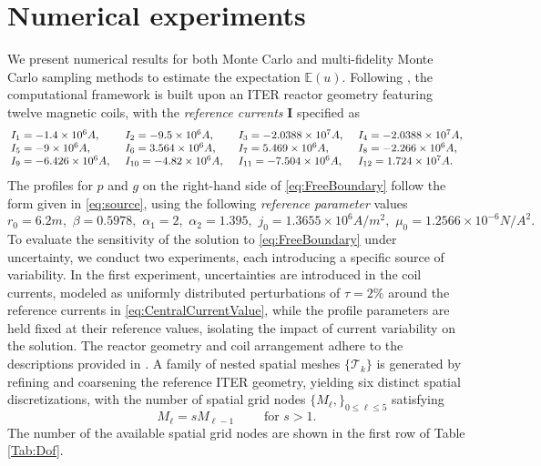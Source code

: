 \section{Numerical experiments}\label{sec:Num-Exp}
%
We present numerical results for both Monte Carlo and multi-fidelity Monte Carlo sampling methods to estimate the expectation $\mathbb{E}(u)$. Following \cite{FaHe:2017}, the computational framework is built upon an ITER reactor geometry featuring twelve magnetic coils, with the \textit{reference currents} $\boldsymbol{I}$ specified as
%
\begin{equation}\label{eq:CentralCurrentValue}
{\renewcommand{\arraycolsep}{2pt}
\begin{array}{llll}
I_1 = -1.4 \times 10^{6} A, \quad & I_2 = -9.5 \times 10^{6} A, \quad & I_3 = -2.0388 \times 10^{7} A, \quad & I_4 = -2.0388 \times 10^{7} A, \\
I_5 = -9 \times 10^{6} A, \quad & I_6 = 3.564 \times 10^{6} A, \quad & I_7 = 5.469 \times 10^{6} A, \quad & I_8 = -2.266 \times 10^{6} A, \\
I_9 = -6.426 \times 10^{6} A, \quad & I_{10} = -4.82 \times 10^{6} A, \quad & I_{11} = -7.504 \times 10^{6} A, \quad & I_{12} = 1.724 \times 10^{7} A. 
\end{array}
}
\end{equation}
%
The profiles for $p$ and $g$ on the right-hand side of \eqref{eq:FreeBoundary} follow the form given in \eqref{eq:source}, using the following \textit{reference parameter} values
%
\begin{equation}\label{eq:CentralParameterValue}
r_0=6.2m,\,\,\beta=0.5978, \,\, \alpha_1 = 2, \,\,  \alpha_2=1.395, \,\, j_0=1.3655 \times 10^6 A/m^2,\,\,  \mu_0=1.2566\times 10^{-6} N/A^2.
\end{equation}
%
To evaluate the sensitivity of the solution to \eqref{eq:FreeBoundary} under uncertainty, we conduct two experiments, each introducing a specific source of variability. In the first experiment, uncertainties are introduced in the coil currents, modeled as uniformly distributed perturbations of $\tau = 2\%$ around the reference currents in \eqref{eq:CentralCurrentValue}, while the profile parameters are held fixed at their reference values, isolating the impact of current variability on the solution.   The reactor geometry and coil arrangement adhere to the descriptions provided in \cite{Amoskov:2009}.  A family of nested spatial meshes $\{\mathcal{T}_k\}$ is generated by refining and coarsening the reference ITER geometry, yielding six distinct spatial discretizations, with the number of spatial grid nodes $\{M_\ell,\}_{0\le \ell \le 5}$  satisfying
%
\begin{equation}
\label{eq:MeshGrowth}
M_\ell = s M_{\ell-1} \qquad \text{ for } s>1.
\end{equation}
%
The number of the available spatial grid nodes are shown in the first row of Table \ref{Tab:Dof}.


